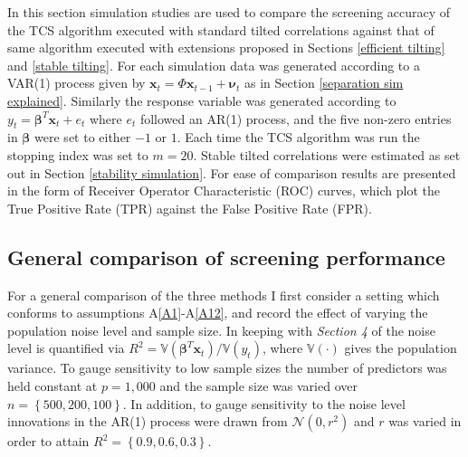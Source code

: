 \documentclass[11pt]{report}\usepackage[utf8]{inputenc}
\begin{document}
In this section simulation studies are used to compare the screening accuracy of the TCS algorithm executed with standard tilted correlations against that of same algorithm executed with extensions proposed in Sections \ref{efficient tilting} and \ref{stable tilting}. For each simulation data was generated according to a VAR(1) process given by $\mathbf{x}_t = \Phi \mathbf{x}_{t-1} + \boldsymbol{\nu}_t$ as in Section \ref{separation sim explained}. Similarly the response variable was generated according to $y_t = \boldsymbol{\beta}^T\mathbf{x}_t + e_t$ where $e_t$ followed an AR(1) process, and the five non-zero entries in $\boldsymbol{\beta}$ were set to either $-1$ or $1$. Each time the TCS algorithm was run the stopping index was set to $m=20$. Stable tilted correlations were estimated as set out in Section \ref{stability simulation}. For ease of comparison results are presented in the form of Receiver Operator Characteristic (ROC) curves, which plot the True Positive Rate (TPR) against the False Positive Rate (FPR).

\subsection{General comparison of screening performance}\label{general comparison}

For a general comparison of the three methods I first consider a setting which conforms to assumptions A\ref{A1}-A\ref{A12}, and record the effect of varying the population noise level and sample size. In keeping with \textit{Section 4} of \cite{cho2012high} the noise level is quantified via $R^2 = \mathbb{V}\left ( \boldsymbol{\beta}^T\mathbf{x}_t \right ) / \mathbb{V}\left ( y_t \right )$, where $\mathbb{V}(\cdot)$ gives the population variance. To gauge sensitivity to low sample sizes the number of predictors was held constant at $p=1,000$ and the sample size was varied over $n =\left \{ 500,200,100 \right \}$. In addition, to gauge sensitivity to the noise level innovations in the AR(1) process were drawn from $\mathcal{N}(0,r^2)$ and $r$ was varied in order to attain $R^2= \left \{ 0.9,0.6,0.3 \right \}$.  
\end{document}
